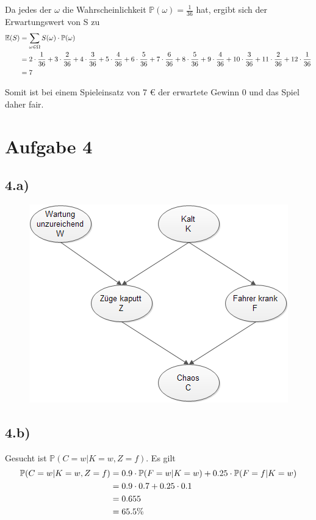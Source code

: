 \documentclass[a4paper]{article}
\newcommand{\IP}{\mathbb{P}}
\newcommand{\IE}{\mathbb{E}}
\begin{document}
Da jedes der $\omega$ die Wahrscheinlichkeit $\IP(\omega)=\frac{1}{36}$ hat, ergibt sich der Erwartungswert von S zu
\begin{align}
	\IE(S) &= \sum_{\omega \in \Omega} S(\omega) \cdot \IP(\omega) \notag \\
	       &= 2\cdot\frac{1}{36}+3\cdot\frac{2}{36}+4\cdot\frac{3}{36}+5\cdot\frac{4}{36}+6\cdot\frac{5}{36}+7\cdot\frac{6}{36}+8\cdot\frac{5}{36}+9\cdot\frac{4}{36}+10\cdot\frac{3}{36}+11\cdot\frac{2}{36}+12\cdot\frac{1}{36} \notag \\
	       &= 7 \notag
\end{align}

Somit ist bei einem Spieleinsatz von 7 \euro{} der erwartete Gewinn 0 und das Spiel daher fair.

\section*{Aufgabe 4}

\subsection*{4.a)}
\begin{figure}[h]
\centering
\includegraphics[width=0.5\columnwidth]{blatt5aufgabe4}
\end{figure}

\subsection*{4.b)}
Gesucht ist $\IP(C=w|K=w,Z=f)$. Es gilt
\begin{align}
	\IP(C=w|K=w,Z=f) &= 0.9 \cdot \IP(F=w|K=w) + 0.25 \cdot \IP(F=f|K=w) \notag \\
									 &= 0.9\cdot0.7 + 0.25\cdot0.1 \notag \\
									 &= 0.655 \notag \\
									 &= 65.5\% \notag 			 
\end{align}
\end{document}
